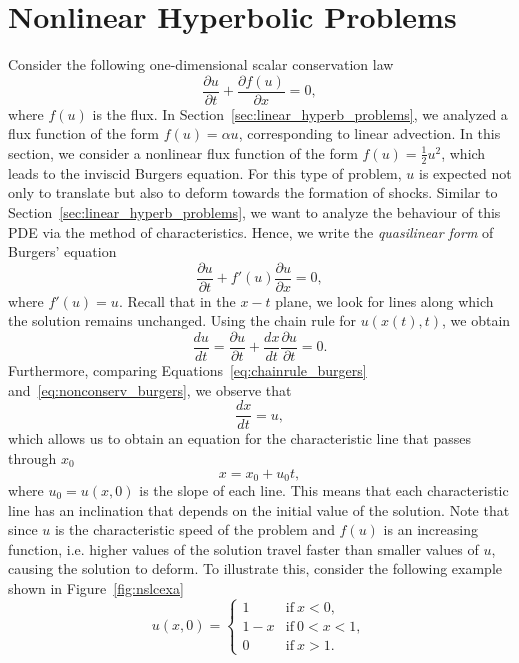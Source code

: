 \section{Nonlinear Hyperbolic Problems}
Consider the following one-dimensional scalar conservation law
\begin{equation}
	\frac{\partial u}{\partial t} + \frac{\partial f(u)}{\partial x} = 0,
\end{equation}
where $f(u)$ is the flux. In Section~\ref{sec:linear_hyperb_problems}, we analyzed a flux function of the form $f(u)=\alpha u$, corresponding to linear advection. In this section, we consider a nonlinear flux function of the form $f(u)=\frac{1}{2} u^2$, which leads to the inviscid Burgers equation. For this type of problem, $u$ is expected not only to translate but also to deform towards the formation of shocks. Similar to Section~\ref{sec:linear_hyperb_problems}, we want to analyze the behaviour of this PDE via the method of characteristics. Hence, we write the \textit{quasilinear form} of Burgers' equation
\begin{equation}
	\frac{\partial u}{\partial t} + f'(u)\frac{\partial u}{\partial x} = 0,
	\label{eq:nonconserv_burgers}
\end{equation}
where $f'(u) = u$. Recall that in the $x-t$ plane, we look for lines along which the solution remains unchanged. Using the chain rule for $u(x(t), t)$, we obtain
\begin{equation}
	\frac{du}{dt} = \frac{\partial u}{\partial t} + \frac{dx}{dt}\frac{\partial u}{\partial t} = 0.
	\label{eq:chainrule_burgers}
\end{equation}
Furthermore, comparing Equations~\ref{eq:chainrule_burgers} and~\ref{eq:nonconserv_burgers}, we observe that
\begin{equation}
	\frac{dx}{dt} = u,
\end{equation}
which allows us to obtain an equation for the characteristic line that passes through $x_0$
\begin{equation}
	x = x_0 + u_0 t,
	\label{eq:charact_burgers}
\end{equation}
where $u_0=u(x,0)$ is the slope of each line. This means that each characteristic line has an inclination that depends on the initial value of the solution. Note that since $u$ is the characteristic speed of the problem and $f(u)$ is an increasing function, i.e. higher values of the solution travel faster than smaller values of $u$, causing the solution to deform. To illustrate this, consider the following example shown in Figure~\ref{fig:nslcexa}
\begin{equation}
	u(x,0) = 
	\begin{cases}
		1 & \text{if}~x < 0,\\
		1-x & \text{if}~0<x<1, \\ 
		0 & \text{if}~x>1.
	\end{cases}
	\label{eq:nlscex0}
\end{equation}

